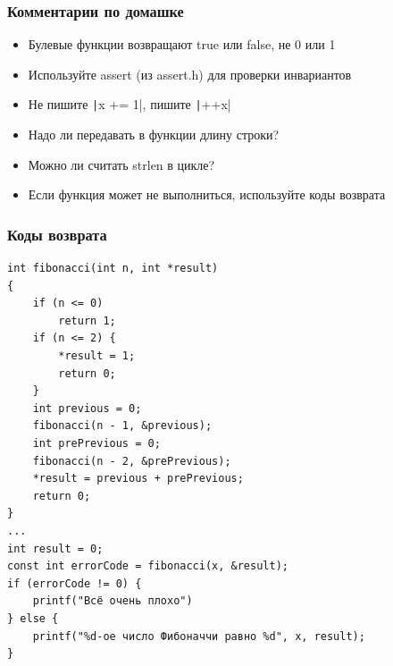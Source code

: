 \documentclass{../../slides-style}
\begin{document}
    
    \begin{frame}[plain]
        \titlepage
    \end{frame}

    \begin{frame}
        \frametitle{Комментарии по домашке}
        \begin{itemize}
            \item Булевые функции возвращают true или false, не 0 или 1
            \item Используйте assert (из assert.h) для проверки инвариантов
            \item Не пишите \texttt|x += 1|, пишите \texttt|++x|
            \item Надо ли передавать в функции длину строки?
            \item Можно ли считать strlen в цикле?
            \item Если функция может не выполниться, используйте коды возврата
        \end{itemize}
    \end{frame}


    \begin{frame}[fragile]
        \frametitle{Коды возврата}
        \begin{scriptsize}
            \begin{verbatim}
int fibonacci(int n, int *result)
{
    if (n <= 0)
        return 1; 
    if (n <= 2) { 
        *result = 1; 
        return 0;
    }
    int previous = 0;
    fibonacci(n - 1, &previous);
    int prePrevious = 0;
    fibonacci(n - 2, &prePrevious);
    *result = previous + prePrevious;
    return 0;
}
...
int result = 0;
const int errorCode = fibonacci(x, &result);
if (errorCode != 0) {
    printf("Всё очень плохо")
} else {
    printf("%d-ое число Фибоначчи равно %d", x, result);
}
            \end{verbatim}
        \end{scriptsize}
    \end{frame}
\end{document}
